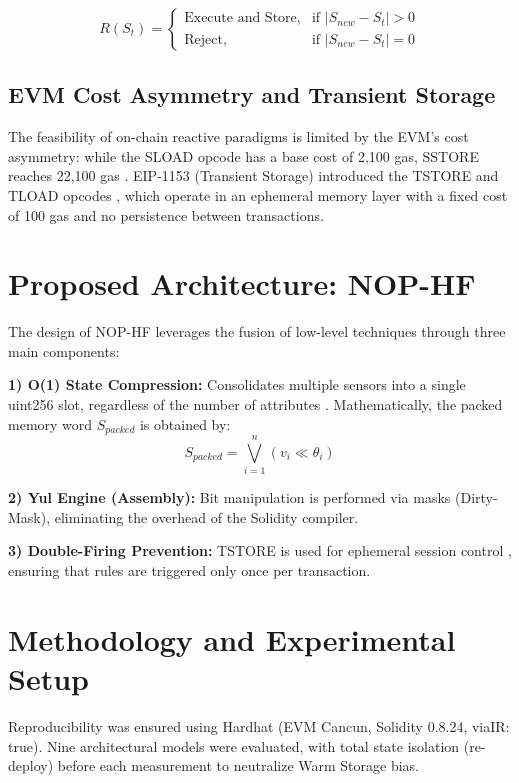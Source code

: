 \documentclass[conference]{IEEEtran}
\begin{document}
\begin{equation}
R(S_t) = 
\begin{cases} 
\text{Execute and Store}, & \text{if } |S_{new} - S_t| > 0 \\
\text{Reject}, & \text{if } |S_{new} - S_t| = 0 
\end{cases}
\end{equation}

\subsection{EVM Cost Asymmetry and Transient Storage}
The feasibility of on-chain reactive paradigms is limited by the EVM's cost asymmetry: while the SLOAD opcode has a base cost of 2,100 gas, SSTORE reaches 22,100 gas \cite{eip2200}. EIP-1153 (Transient Storage) introduced the TSTORE and TLOAD opcodes \cite{eip1153_official} \cite{eip1153_magicians}, which operate in an ephemeral memory layer with a fixed cost of 100 gas and no persistence between transactions.


\section{Proposed Architecture: NOP-HF}
The design of NOP-HF leverages the fusion of low-level techniques through three main components:

\textbf{1) O(1) State Compression:} Consolidates multiple sensors into a single uint256 slot, regardless of the number of attributes \cite{alchemy_yul} \cite{rareskills_gas}. Mathematically, the packed memory word $S_{packed}$ is obtained by:
\begin{equation}
S_{packed} = \bigvee_{i=1}^{n} (v_i \ll \theta_i)
\end{equation}

\textbf{2) Yul Engine (Assembly):} Bit manipulation is performed via masks (Dirty-Mask), eliminating the overhead of the Solidity compiler.

\textbf{3) Double-Firing Prevention:} TSTORE is used for ephemeral session control \cite{dedaub_transient}, ensuring that rules are triggered only once per transaction.


\section{Methodology and Experimental Setup}
Reproducibility was ensured using Hardhat (EVM Cancun, Solidity 0.8.24, viaIR: true). Nine architectural models were evaluated, with total state isolation (re-deploy) before each measurement to neutralize Warm Storage bias.
\end{document}
